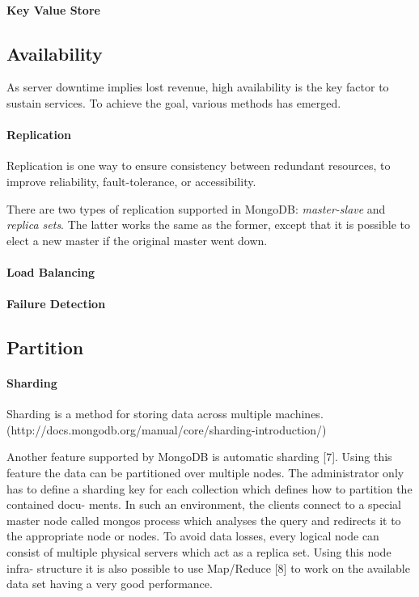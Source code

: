 \documentclass[12pt,letter]{article}
\begin{document}
\paragraph*{Key Value Store}


\subsection{Availability}
As server downtime implies lost revenue, high availability is the key factor to sustain services. To achieve the goal, various methods has emerged.

\paragraph*{Replication}
Replication is one way to ensure consistency between redundant resources,  to improve reliability, fault-tolerance, or accessibility.

There are two types of replication supported in MongoDB: \textit{master-slave} and \textit{replica sets}.\citep{Suter2012} The latter works the same as the former, except that it is possible to elect a new master if the original master went down.

\paragraph*{Load Balancing} 

\paragraph*{Failure Detection}


\subsection{Partition}
\paragraph*{Sharding}
Sharding is a method for storing data across multiple machines. (http://docs.mongodb.org/manual/core/sharding-introduction/)

Another feature supported by MongoDB is automatic sharding [7]. Using this feature the data can be partitioned over multiple nodes. The administrator only has to define a sharding key for each collection which defines how to partition the contained docu- ments. In such an environment, the clients connect to a special master node called mongos process which analyses the query and redirects it to the appropriate node or nodes. To avoid data losses, every logical node can consist of multiple physical servers which act as a replica set. Using this node infra- structure it is also possible to use Map/Reduce [8] to work on the available data set having a very good performance.
\end{document}
